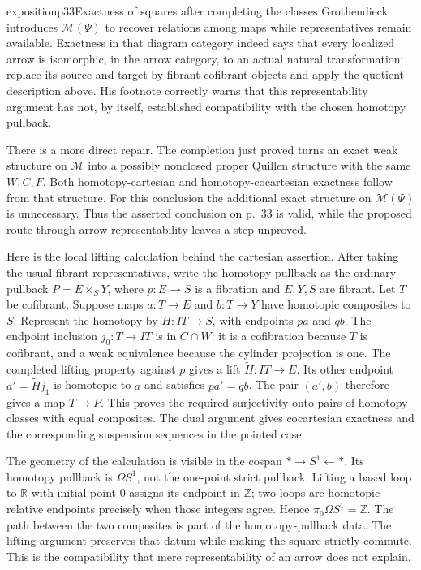 \begin{dcomment}{exposition}{p33}{Exactness of squares after completing the classes}
Grothendieck introduces $\mathcal M(\Psi)$ to recover relations among maps while representatives remain available. Exactness in that diagram category indeed says that every localized arrow is isomorphic, in the arrow category, to an actual natural transformation: replace its source and target by fibrant-cofibrant objects and apply the quotient description above. His footnote correctly warns that this representability argument has not, by itself, established compatibility with the chosen homotopy pullback.

There is a more direct repair. The completion just proved turns an exact weak structure on $\mathcal M$ into a possibly nonclosed proper Quillen structure with the same $W,C,F$. Both homotopy-cartesian and homotopy-cocartesian exactness follow from that structure. For this conclusion the additional exact structure on $\mathcal M(\Psi)$ is unnecessary. Thus the asserted conclusion on p.~33 is valid, while the proposed route through arrow representability leaves a step unproved.

Here is the local lifting calculation behind the cartesian assertion. After taking the usual fibrant representatives, write the homotopy pullback as the ordinary pullback $P=E\times_SY$, where $p:E\to S$ is a fibration and $E,Y,S$ are fibrant. Let $T$ be cofibrant. Suppose maps $a:T\to E$ and $b:T\to Y$ have homotopic composites to $S$. Represent the homotopy by $H:IT\to S$, with endpoints $pa$ and $qb$. The endpoint inclusion $j_0:T\to IT$ is in $C\cap W$: it is a cofibration because $T$ is cofibrant, and a weak equivalence because the cylinder projection is one. The completed lifting property against $p$ gives a lift $\widetilde H:IT\to E$. Its other endpoint $a'=\widetilde H j_1$ is homotopic to $a$ and satisfies $pa'=qb$. The pair $(a',b)$ therefore gives a map $T\to P$. This proves the required surjectivity onto pairs of homotopy classes with equal composites. The dual argument gives cocartesian exactness and the corresponding suspension sequences in the pointed case.

The geometry of the calculation is visible in the cospan $*\to S^1\leftarrow *$. Its homotopy pullback is $\Omega S^1$, not the one-point strict pullback. Lifting a based loop to $\mathbb R$ with initial point $0$ assigns its endpoint in $\mathbb Z$; two loops are homotopic relative endpoints precisely when those integers agree. Hence $\pi_0\Omega S^1=\mathbb Z$. The path between the two composites is part of the homotopy-pullback data. The lifting argument preserves that datum while making the square strictly commute. This is the compatibility that mere representability of an arrow does not explain.
\end{dcomment}


